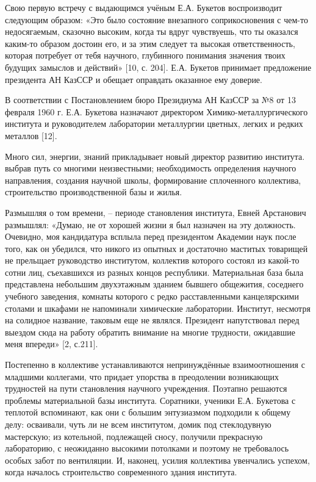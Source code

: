 Свою первую встречу с выдающимся учёным Е.А. Букетов воспроизводит
следующим образом: «Это было состояние внезапного соприкосновения с
чем-то недосягаемым, сказочно высоким, когда ты вдруг чувствуешь, что ты
оказался каким-то образом достоин его, и за этим следует та высокая
ответственность, которая потребует от тебя научного, глубинного
понимания значения твоих будущих замыслов и действий» {[}10, с. 204{]}.
Е.А. Букетов принимает предложение президента АН КазССР и обещает
оправдать оказанное ему доверие.

В соответствии с Постановлением бюро Президиума АН КазССР за №8 от 13
февраля 1960 г. Е.А. Букетова назначают директором
Химико-металлургического института и руководителем лаборатории
металлургии цветных, легких и редких металлов {[}12{]}.

Много сил, энергии, знаний прикладывает новый директор развитию
института. выбрав путь со многими неизвестными; необходимость
определения научного направления, создания научной школы, формирование
сплоченного коллектива, строительство производственной базы и жилья.

Размышляя о том времени, -- периоде становления института, Евней
Арстанович размышлял: «Думаю, не от хорошей жизни я был назначен на эту
должность. Очевидно, моя кандидатура всплыла перед президентом Академии
наук после того, как он убедился, что никого из опытных и достаточно
маститых товарищей не прельщает руководство институтом, коллектив
которого состоял из какой-то сотни лиц, съехавшихся из разных концов
республики. Материальная база была представлена небольшим двухэтажным
зданием бывшего общежития, соседнего учебного заведения, комнаты
которого с редко расставленными канцелярскими столами и шкафами не
напоминали химические лаборатории. Институт, несмотря на солидное
название, таковым еще не являлся. Президент напутствовал перед выездом
сюда на работу обратить внимание на многие трудности, ожидавшие меня
впереди» {[}2, с.211{]}.

Постепенно в коллективе устанавливаются непринуждённые взаимоотношения с
младшими коллегами, что придает упорства в преодолении возникающих
трудностей на пути становления научного учреждения. Поэтапно решаются
проблемы материальной базы института. Соратники, ученики Е.А. Букетова с
теплотой вспоминают, как они с большим энтузиазмом подходили к общему
делу: осваивали, чуть ли не всем институтом, домик под стеклодувную
мастерскую; из котельной, подлежащей сносу, получили прекрасную
лабораторию, с неожиданно высокими потолками и поэтому не требовалось
особых забот по вентиляции. И, наконец, усилия коллектива увенчались
успехом, когда началось строительство современного здания института.

